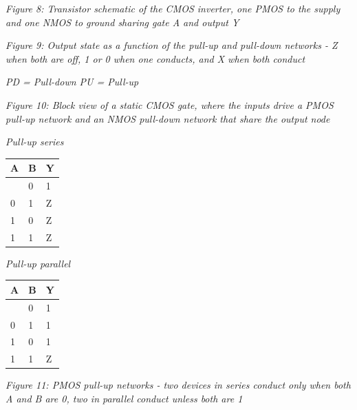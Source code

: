 {
\centering
{}
}

\emph{Figure 8: Transistor schematic of the CMOS inverter, one PMOS to
the supply and one NMOS to ground sharing gate A and output Y}


{
\centering
{}
}

\emph{Figure 9: Output state as a function of the pull-up and pull-down
networks - Z when both are off, 1 or 0 when one conducts, and X when
both conduct}

\emph{PD = Pull-down PU = Pull-up}

\begin{Shaded}
\begin{Highlighting}[]
\OperatorTok{=\textgreater{}} \OperatorTok{[}\OperatorTok{,}\OperatorTok{,}\OperatorTok{,}\OperatorTok{];}
\end{Highlighting}
\end{Shaded}


{
\centering
{}
}

\emph{Figure 10: Block view of a static CMOS gate, where the inputs
drive a PMOS pull-up network and an NMOS pull-down network that share
the output node}

\emph{Pull-up series}

\begin{longtable}[]{@{}lll@{}}
\toprule\noalign{}
A & B & Y \\
\midrule\noalign{}
\endhead
\bottomrule\noalign{}
\endlastfoot
0 & 0 & 1 \\
0 & 1 & Z \\
1 & 0 & Z \\
1 & 1 & Z \\
\end{longtable}

\emph{Pull-up parallel}

\begin{longtable}[]{@{}lll@{}}
\toprule\noalign{}
A & B & Y \\
\midrule\noalign{}
\endhead
\bottomrule\noalign{}
\endlastfoot
0 & 0 & 1 \\
0 & 1 & 1 \\
1 & 0 & 1 \\
1 & 1 & Z \\
\end{longtable}


{
\centering
{}
}

\emph{Figure 11: PMOS pull-up networks - two devices in series conduct
only when both A and B are 0, two in parallel conduct unless both are 1}

